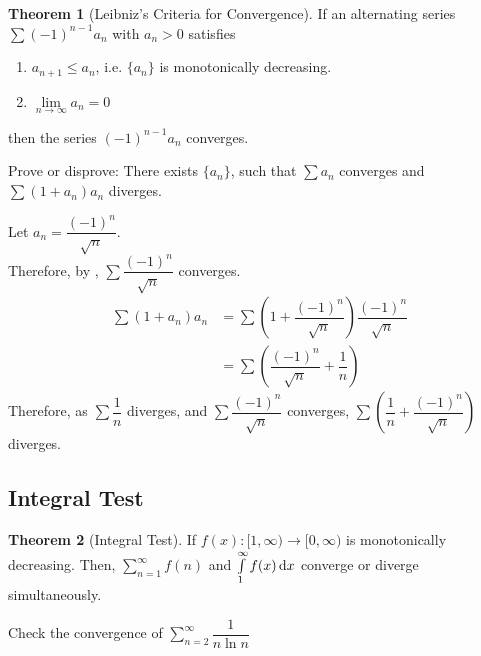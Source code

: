 \documentclass[fleqn, a4paper, 12pt, twoside]{article}
\theoremstyle{definition}
\theoremstyle{theorem}
\newtheorem{theorem}{Theorem}
\begin{document}
\begin{theorem}[Leibniz's Criteria for Convergence]
	If an alternating series $\sum (-1)^{n - 1} a_n$ with $a_n > 0$ satisfies
	\begin{enumerate}
		\item $a_{n + 1} \le a_n$, i.e. $\{a_n\}$ is monotonically decreasing.
		\item $\lim\limits_{n \to \infty} a_n = 0$
	\end{enumerate}
	then the series $(-1)^{n - 1} a_n$ converges.
	\label{Leibniz's_Criteria_for_Convergence}
\end{theorem}

\begin{question}
	Prove or disprove: There exists $\{a_n\}$, such that $\sum a_n$ converges and $\sum (1 + a_n) a_n$ diverges.
\end{question}

\begin{solution}
	Let $a_n = \dfrac{(-1)^n}{\sqrt{n}}$.\\
	Therefore, by , $\sum \dfrac{(-1)^n}{\sqrt{n}}$ converges.\\
	\begin{align*}
		\sum (1 + a_n) a_n &= \sum \left( 1 + \dfrac{(-1)^n}{\sqrt{n}} \right) \dfrac{(-1)^n}{\sqrt{n}}\\
		&= \sum \left( \dfrac{(-1)^n}{\sqrt{n}} + \dfrac{1}{n} \right)
	\end{align*}
	Therefore, as $\sum \dfrac{1}{n}$ diverges, and $\sum \dfrac{(-1)^n}{\sqrt{n}}$ converges, $\sum \left( \dfrac{1}{n} + \dfrac{(-1)^n}{\sqrt{n}} \right)$ diverges.
\end{solution}

\subsection{Integral Test}

\begin{theorem}[Integral Test]
	If $f(x) : [1, \infty) \to [0, \infty)$ is monotonically decreasing.
	Then, $\sum\limits_{n = 1}^{\infty} f(n)$ and $\int\limits_{1}^{\infty} f(x) \dif x$ converge or diverge simultaneously.
	\label{Integral_Test}
\end{theorem}

\begin{question}
	Check the convergence of $\sum\limits_{n = 2}^{\infty} \dfrac{1}{n \ln n}$
\end{question}
\end{document}
